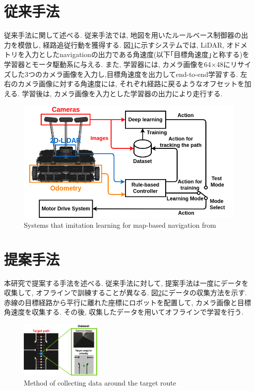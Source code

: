 \documentclass[10pt]{ujarticle}
\begin{document}
    \section{従来手法}%
    従来手法に関して述べる. 従来手法では, 地図を用いたルールベース制御器の出力を模倣し, 経路追従行動を獲得する. 図\ref{Fig:si2020-okada}に示すシステムでは, LiDAR, オドメトリを入力としたnavigation\cite{navigation}の出力である角速度(以下｢目標角速度｣と称する)を学習器とモータ駆動系に与える. また, 学習器には, カメラ画像を64×48にリサイズした3つのカメラ画像を入力し,目標角速度を出力してend-to-end学習する. 左右のカメラ画像に対する角速度には, それぞれ経路に戻るようなオフセットを加える. 学習後は, カメラ画像を入力とした学習器の出力により走行する. 

    \begin{figure}[h]
        \centering
        \includegraphics[keepaspectratio, scale=0.3]{fig/si2020-okada.png}
        \caption{Systems that imitation learning for map-based navigation from\cite{si2020-okada}}
        \label{Fig:si2020-okada}
    \end{figure}

    \section{提案手法}%
    本研究で提案する手法を述べる. 従来手法に対して, 提案手法は一度にデータを収集して, オフラインで訓練することが異なる. 図\ref{Fig:collect}にデータの収集方法を示す. 赤線の目標経路から平行に離れた座標にロボットを配置して, カメラ画像と目標角速度を収集する. その後, 収集したデータを用いてオフラインで学習を行う. 

    \begin{figure}[h]
        \centering
        \includegraphics[width=0.35\textwidth]{fig/collect-data2.png}
        \caption{Method of collecting data around the target route}
        \label{Fig:collect}
    \end{figure}
\end{document}
